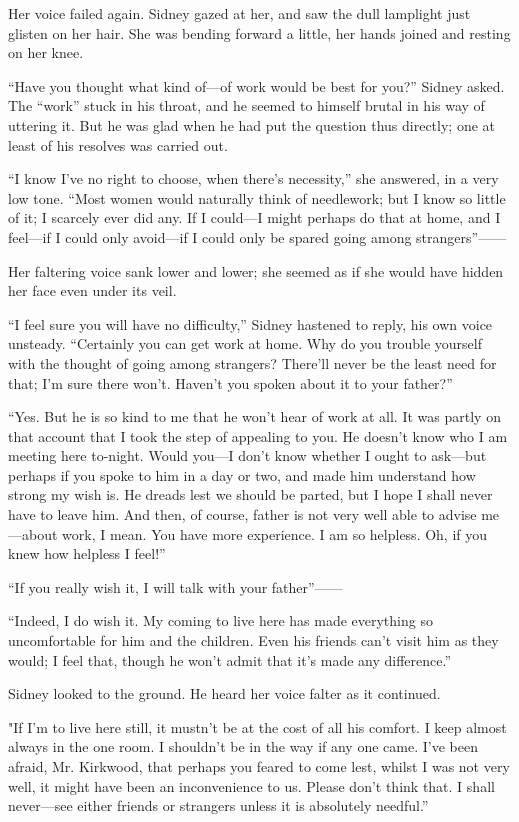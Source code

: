 Her voice failed again. Sidney gazed at her, and saw the dull lamplight
just glisten on her hair. She was bending forward a little, her hands
joined and resting on her knee.

{}``Have you thought what kind of---of work would be best for you?''
Sidney asked. The ``work'' stuck in his throat, and he seemed to himself
brutal in his way of uttering it. But he was glad when he had put the
question thus directly; one at least of his resolves was carried out.

``I know I've no right to choose, when there's necessity,'' she
answered, in a very low tone. ``Most women would naturally think of
needlework; but I know so little of it; I scarcely ever did any. If I
could---I might perhaps do that at home, and I feel---if I could only
avoid---if I could only be spared going among strangers''{{------}}

Her faltering voice sank lower and lower; she seemed as if she would
have hidden her face even under its veil.

``I feel sure you will have no difficulty,'' Sidney hastened to reply,
his own voice unsteady. ``Certainly you can get work at home. Why do you
trouble yourself with the thought of going among strangers? There'll
never be the least need for that; I'm sure there won't. Haven't you
spoken about it to your father?''

{}``Yes. But he is so kind to me that he won't hear of work at all. It
was partly on that account that I took the step of appealing to you. He
doesn't know who I am meeting here to-night. Would you---I don't know
whether I ought to ask---but perhaps if you spoke to him in a day or
two, and made him understand how strong my wish is. He dreads lest we
should be parted, but I hope I shall never have to leave him. And then,
of course, father is not very well able to advise me---about work, I
mean. You have more experience. I am so helpless. Oh, if you knew how
helpless I feel!''

``If you really wish it, I will talk with your father''{{------}}

``Indeed, I do wish it. My coming to live here has made everything so
uncomfortable for him and the children. Even his friends can't visit him
as they would; I feel that, though he won't admit that it's made any
difference.''

Sidney looked to the ground. He heard her voice falter as it continued.

"If I'm to live here still, it mustn't be at the cost of all his
comfort. I keep almost {}always in the one room. I shouldn't be in the
way if any one came. I've been afraid, Mr. Kirkwood, that perhaps you
feared to come lest, whilst I was not very well, it might have been an
inconvenience to us. Please don't think that. I shall never---see either
friends or strangers unless it is absolutely needful.''


